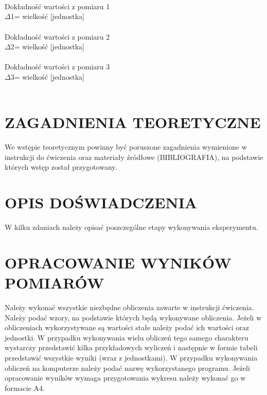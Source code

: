 \documentclass{article}
\begin{document}
\textbf{ }\\
\textbf{ }\\
\textbf{ }\\


\raggedright
    {
        {Dokładność wartości z pomiaru 1} \\
        {$\Delta$1= wielkość [jednostka]}\\
        \textbf{ }\\
        {Dokładność wartości z pomiaru 2} \\
        {$\Delta$2= wielkość [jednostka]}\\
        \textbf{ }\\
        {Dokładność wartości z pomiaru 3} \\
        {$\Delta$3= wielkość [jednostka]}\\
        \textbf{ }\\
    }

\pagebreak


\centering

\section*{ZAGADNIENIA TEORETYCZNE}

{We wstępie teoretycznym powinny być poruszone zagadnienia wymienione w instrukcji do
ćwiczenia oraz materiały źródłowe (BIBLIOGRAFIA), na podstawie których wstęp został
przygotowany.}

\section*{OPIS DOŚWIADCZENIA}

{W kilku zdaniach należy opisać poszczególne etapy wykonywania eksperymentu.}

\section*{OPRACOWANIE WYNIKÓW POMIARÓW}

{Należy wykonać wszystkie niezbędne obliczenia zawarte w instrukcji ćwiczenia.
Należy podać wzory, na podstawie których będą wykonywane obliczenia.
Jeżeli w obliczeniach wykorzystywane są wartości stałe należy podać ich wartości oraz
jednostki.
W przypadku wykonywania wielu obliczeń tego samego charakteru wystarczy przedstawić
kilka przykładowych wyliczeń i następnie w formie tabeli przedstawić wszystkie wyniki (wraz
z jednostkami).
W przypadku wykonywania obliczeń na komputerze należy podać nazwę wykorzystanego
programu. Jeżeli opracowanie wyników wymaga przygotowania wykresu należy wykonać go
w formacie A4.}\\
\end{document}
